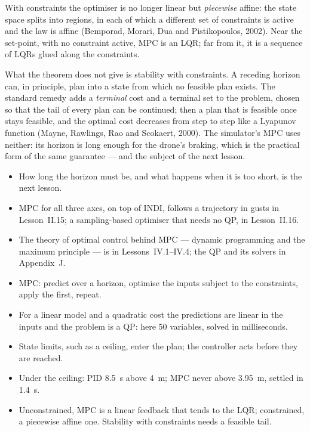 With constraints the optimiser is no longer linear but \emph{piecewise} affine: the state space splits into regions, in each of which a different set of constraints is active and the law is affine (Bemporad, Morari, Dua and Pistikopoulos, 2002). Near the set-point, with no constraint active, MPC is an LQR; far from it, it is a sequence of LQRs glued along the constraints.

What the theorem does not give is stability with constraints. A receding horizon can, in principle, plan into a state from which no feasible plan exists. The standard remedy adds a \emph{terminal} cost and a terminal set to the problem, chosen so that the tail of every plan can be continued; then a plan that is feasible once stays feasible, and the optimal cost decreases from step to step like a Lyapunov function (Mayne, Rawlings, Rao and Scokaert, 2000). The simulator's MPC uses neither: its horizon is long enough for the drone's braking, which is the practical form of the same guarantee — and the subject of the next lesson.

\begin{lookahead}
\begin{itemize}[leftmargin=1.2em]
  \item How long the horizon must be, and what happens when it is too short, is the next lesson.
  \item MPC for all three axes, on top of INDI, follows a trajectory in gusts in Lesson~II.15; a sampling-based optimiser that needs no QP, in Lesson~II.16.
  \item The theory of optimal control behind MPC — dynamic programming and the maximum principle — is in Lessons~IV.1--IV.4; the QP and its solvers in Appendix~J.
\end{itemize}
\end{lookahead}

\begin{remember}
\begin{itemize}
  \item MPC: predict over a horizon, optimise the inputs subject to the constraints, apply the first, repeat.
  \item For a linear model and a quadratic cost the predictions are linear in the inputs and the problem is a QP: here 50 variables, solved in milliseconds.
  \item State limits, such as a ceiling, enter the plan; the controller acts before they are reached.
  \item Under the ceiling: PID \SI{8.5}{s} above \SI{4}{m}; MPC never above \SI{3.95}{m}, settled in \SI{1.4}{s}.
  \item Unconstrained, MPC is a linear feedback that tends to the LQR; constrained, a piecewise affine one. Stability with constraints needs a feasible tail.
\end{itemize}
\end{remember}

